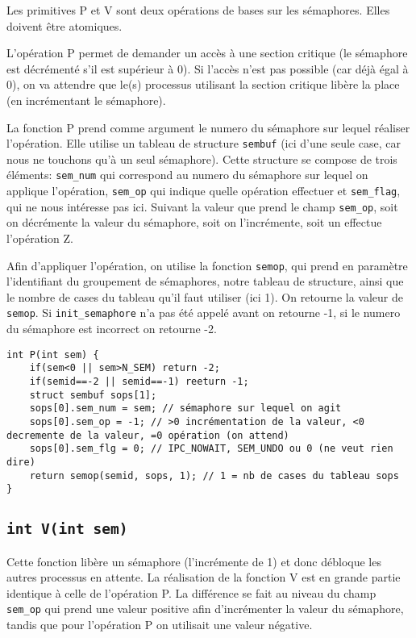 Les primitives P et V sont deux opérations de bases sur les sémaphores. Elles doivent être atomiques.

\medskip

L'opération P permet de demander un accès à une section critique (le sémaphore est décrémenté s'il est supérieur à 0). Si l'accès n'est pas possible (car déjà égal à 0), on va attendre que le(s) processus utilisant la section critique libère la place (en incrémentant le sémaphore).

\medskip

La fonction P prend comme argument le numero du sémaphore sur lequel réaliser l'opération. Elle utilise un tableau de structure \lstinline{sembuf} (ici d'une seule case, car nous ne touchons qu'à un seul sémaphore). Cette structure se compose de trois éléments: \lstinline{sem_num} qui correspond au numero du sémaphore sur lequel on applique l'opération, \lstinline{sem_op} qui indique quelle opération effectuer et \lstinline{sem_flag}, qui ne nous intéresse pas ici. Suivant la valeur que prend le champ \lstinline{sem_op}, soit on décrémente la valeur du sémaphore, soit on l'incrémente, soit un effectue l'opération Z.

\medskip

Afin d'appliquer l'opération, on utilise la fonction \lstinline{semop}, qui prend en paramètre l'identifiant du groupement de sémaphores, notre tableau de structure, ainsi que le nombre de cases du tableau qu'il faut utiliser (ici 1). On retourne la valeur de \lstinline{semop}. Si \lstinline{init_semaphore} n'a pas été appelé avant on retourne -1, si le numero du sémaphore est incorrect on retourne -2.

\begin{lstlisting}
int P(int sem) {
    if(sem<0 || sem>N_SEM) return -2;
    if(semid==-2 || semid==-1) reeturn -1;
    struct sembuf sops[1];
    sops[0].sem_num = sem; // sémaphore sur lequel on agit
    sops[0].sem_op = -1; // >0 incrémentation de la valeur, <0 decremente de la valeur, =0 opération (on attend)
    sops[0].sem_flg = 0; // IPC_NOWAIT, SEM_UNDO ou 0 (ne veut rien dire)
    return semop(semid, sops, 1); // 1 = nb de cases du tableau sops
}
\end{lstlisting}

\subsection{\lstinline{int V(int sem)}}

Cette fonction libère un sémaphore (l'incrémente de 1) et donc débloque les autres processus en attente. La réalisation de la fonction V est en grande partie identique à celle de l'opération P. La différence se fait au niveau du champ \lstinline{sem_op} qui prend une valeur positive afin d'incrémenter la valeur du sémaphore, tandis que pour l'opération P on utilisait une valeur négative.


